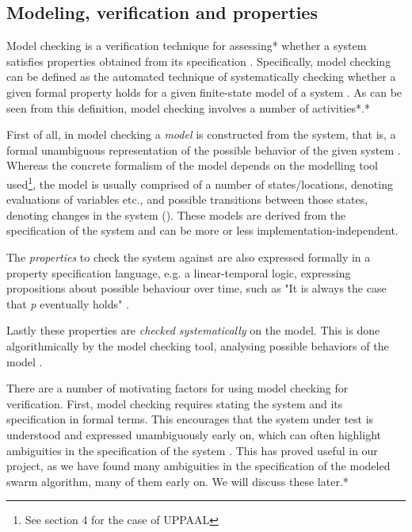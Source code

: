 \subsection{Modeling, verification and properties}

Model checking is a verification technique for assessing* whether a system satisfies properties obtained from its specification \parencite[p. 3]{Baier_Katoen_2008}. Specifically, model checking can be defined as the automated technique of systematically checking whether a given formal property holds for a given finite-state model of a system \parencite[p. 11]{Baier_Katoen_2008}. As can be seen from this definition, model checking involves a number of activities*.* 

First of all, in model checking a \textit{model} is constructed from the system, that is, a formal unambiguous representation of the possible behavior of the given system \parencite[p. 12]{Baier_Katoen_2008}. Whereas the concrete formalism of the model depends on the modelling tool used\footnote{See section 4 for the case of UPPAAL}, the model is usually comprised of a number of states/locations, denoting evaluations of variables etc., and possible transitions between those states, denoting changes in the system (\parencite[p. 12]{Baier_Katoen_2008}). These models are derived from the specification of the system and can be more or less implementation-independent. 

The \textit{properties} to check the system against are also expressed formally in a property specification language, e.g. a linear-temporal logic, expressing propositions about possible behaviour over time, such as "It is always the case that \textit{p} eventually holds" \parencite[p. 12]{Baier_Katoen_2008}.  

Lastly these properties are \textit{checked systematically} on the model. This is done algorithmically by the model checking tool, analysing possible behaviors of the model \parencite[pp. 7, 13]{Baier_Katoen_2008}.

There are a number of motivating factors for using model checking for verification. First, model checking requires stating the system and its specification in formal terms. This encourages that the system under test is understood and expressed unambiguously early on, which can often highlight ambiguities in the specification of the system \parencite[p. 7]{Baier_Katoen_2008}. This has proved useful in our project, as we have found many ambiguities in the specification of the modeled swarm algorithm, many of them early on. We will discuss these later.* 

